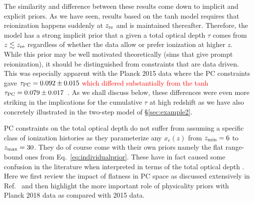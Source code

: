 \documentclass[prd,twocolumn,amsmath,amssymb,floatfix,superscriptaddress,nofootinbib]{revtex4-1}
\newcommand{\ch}[1]{\textcolor{red}{#1}}
\begin{document}
The similarity and difference between these results come down to implicit and explicit priors. As we have seen, 
results based on the tanh model requires that reionization happens suddenly at $z_{\rm re}$ and is maintained thereafter.   Therefore, the model has a strong implicit prior that a given a total optical depth $\tau$ comes from $z\lesssim z_{\rm re}$ regardless of whether the data allow or prefer
ionization at higher $z$.  While this prior may be well motivated
theoretically \cite{XX} (sims that give prompt reionization), it should be distinguished from constraints that are data driven.  
This was especially apparent with the Planck 2015 data where
the PC constraints gave \ch{$\tau_{\rm PC}=0.092\pm0.015$ which differed substantially from the tanh $\tau_{\rm PC}=0.079\pm0.017$~\cite{Heinrich:2016ojb}}.  As we shall discuss
below, these differences were even more striking in the implications for the cumulative $\tau$ at high redshift as we have also concretely illustrated in the two-step model of \S \ref{sec:example2}.

PC constraints on the total optical depth do not suffer from assuming a specific class of ionization histories as they parameterize any $x_e(z)$ from $z_{\rm min}=6$ to $z_{\rm max}=30$.
They do of course come with their own priors namely the flat
range-bound ones from Eq.~\eqref{eq:individualprior}.
These have in fact caused some confusion in the literature when interpreted in terms of the total optical depth \cite{Millea:2018bko}.  Here we first review the impact of flatness in PC space as discussed extensively in Ref.~\cite{Heinrich:2018btc} and then highlight the more important role of physicality priors with Planck 2018 data as compared with
2015 data.
\end{document}
